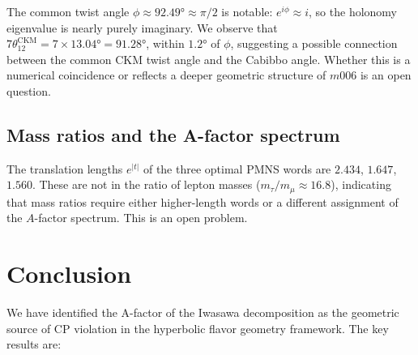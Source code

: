 \documentclass[floatfix,aps,prd,twocolumn,showpacs,superscriptaddress,longbibliography]{revtex4-2}
\begin{document}
The common twist angle $\phi \approx 92.49° \approx \pi/2$
is notable: $e^{i\phi} \approx i$, so the holonomy eigenvalue
is nearly purely imaginary. We observe that
$7\theta_{12}^{\mathrm{CKM}} = 7 \times 13.04° = 91.28°$,
within $1.2°$ of $\phi$, suggesting a possible connection
between the common CKM twist angle and the Cabibbo angle.
Whether this is a numerical coincidence or reflects a deeper
geometric structure of $m006$ is an open question.

\subsection{Mass ratios and the A-factor spectrum}

The translation lengths $e^{|t|}$ of the three optimal PMNS words
are $2.434$, $1.647$, $1.560$. These are not in the ratio of
lepton masses ($m_\tau/m_\mu \approx 16.8$), indicating that
mass ratios require either higher-length words or a different
assignment of the $A$-factor spectrum. This is an open problem.

\section{Conclusion}
\label{sec:conclusion}

We have identified the A-factor of the Iwasawa decomposition as
the geometric source of CP violation in the hyperbolic flavor
geometry framework. The key results are:
\end{document}
